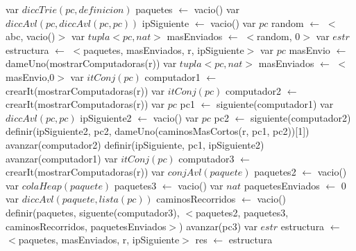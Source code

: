 \begin{algorithm}\phantom{[H]}
\begin{algorithmic}[1]
  \State var $diccTrie(pc, definicion)$ paquetes $\gets$ vacio() 
  \State var $diccAvl(pc, diccAvl(pc, pc))$ ipSiguiente $\gets$ vacio() 
   
    \State var $pc$ random $\gets$ $<$abc, vacio()$>$ 
    \State var $tupla<pc,nat>$ masEnviados $\gets$ $<$random, 0$>$ 
    \State var $estr$ estructura $\gets$ $<$paquetes, masEnviados, r, ipSiguiente$>$ 
  \Else
    \State var $pc$ masEnvio $\gets$ dameUno(mostrarComputadoras(r)) 
    \State var $tupla<pc,nat>$ masEnviados $\gets$ $<$masEnvio,0$>$ 
    \State var $itConj(pc)$ computador1 $\gets$ crearIt(mostrarComputadoras(r)) 
     
      \State var $itConj(pc)$ computador2 $\gets$ crearIt(mostrarComputadoras(r)) 
      \State var $pc$ pc1 $\gets$ siguiente(computador1) 
      \State var $diccAvl(pc, pc)$ ipSiguiente2 $\gets$ vacio() 
       
        \State var $pc$ pc2 $\gets$ siguiente(computador2)  
          \State definir(ipSiguiente2, pc2, dameUno(caminosMasCortos(r, pc1, pc2))[1]) 
        \EndIf
        \State avanzar(computador2) 
      \EndWhile  
      \State definir(ipSiguiente, pc1, ipSiguiente2) 
      \State avanzar(computador1) 
    \EndWhile
    \State var $itConj(pc)$ computador3 $\gets$ crearIt(mostrarComputadoras(r)) 
     
      \State var $conjAvl(paquete)$ paquetes2 $\gets$ vacio() 
      \State var $colaHeap(paquete)$ paquetes3 $\gets$ vacio() 
      \State var $nat$ paquetesEnviados $\gets$ 0 
      \State var $diccAvl(paquete, lista(pc))$ caminosRecorridos $\gets$ vacio() 
      \State definir(paquetes, siguente(computador3), $<$paquetes2, paquetes3, caminosRecorridos, paquetesEnviados$>$) 
      \State {}
      \State avanzar(pc3) 
    \EndWhile
    \State var $estr$ estructura $\gets$ $<$paquetes, masEnviados, r, ipSiguiente$>$ 
  \EndIf
  \State res $\gets$ estructura 
\EndFunction
\end{algorithmic}
\end{algorithm}


